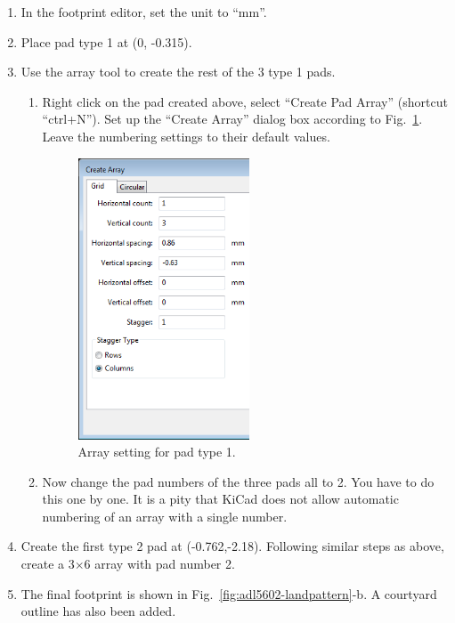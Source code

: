 \documentclass[12pt,letterpaper]{scrartcl}
\begin{document}
\begin{enumerate}
	\item In the footprint editor, set the unit to ``mm''.
	\item Place pad type 1 at (0, -0.315). 
	\item Use the array tool to create the rest of the 3 type 1 pads. 	
		\begin{enumerate}
			\item Right click on the pad created above, select ``Create Pad Array'' (shortcut ``ctrl+N''). Set up the ``Create Array'' dialog box according to Fig.~\ref{fig:pad-array-1}. Leave the numbering settings to their default values.
			
			\begin{figure}[ph]
				\centering
				\includegraphics[width=2in]{pad-array-1}
				\caption{Array setting for pad type 1.}
				\label{fig:pad-array-1}
			\end{figure}
			
			\item Now change the pad numbers of the three pads all to 2. You have to do this one by one. It is a pity that KiCad does not allow automatic numbering of an array with a single number. 
			 
		\end{enumerate}
	\item Create the first type 2 pad at (-0.762,-2.18). Following similar steps as above, create a 3$\times$6 array with pad number 2.
	
	\item The final footprint is shown in Fig.~\ref{fig:adl5602-landpattern}-b. A courtyard outline has also been added. 

\end{enumerate}
\end{document}
